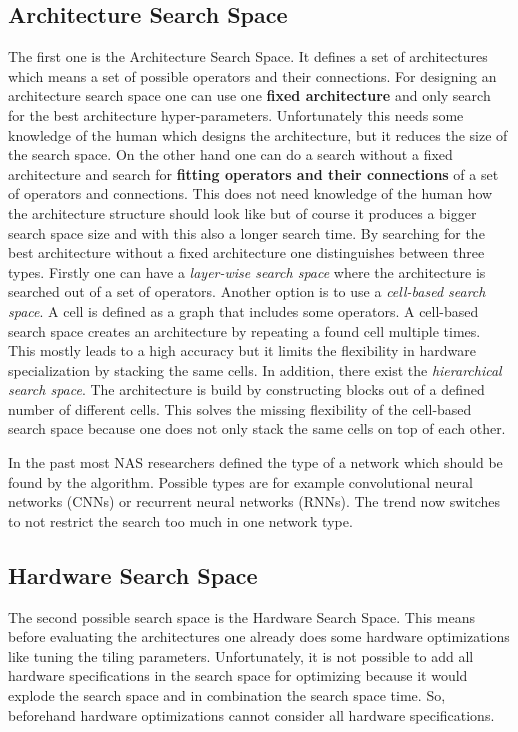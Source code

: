 \documentclass[conference]{IEEEtran}
\begin{document}
\subsection{Architecture Search Space}
The first one is the Architecture Search Space. It defines a set of architectures which means a set of possible operators and their connections. For designing an architecture search space one can use one \textbf{fixed architecture} and only search for the best architecture hyper-parameters. Unfortunately this needs some knowledge of the human which designs the architecture, but it reduces the size of the search space. On the other hand one can do a search without a fixed architecture and search for \textbf{fitting operators and their connections} of a set of operators and connections. This does not need knowledge of the human how the architecture structure should look like but of course it produces a bigger search space size and with this also a longer search time. By searching for the best architecture without a fixed architecture one distinguishes between three types. Firstly one can have a \textit{layer-wise search space} where the architecture is searched out of a set of operators. Another option is to use a \textit{cell-based search space}. A cell is defined as a graph that includes some operators. A cell-based search space creates an architecture by repeating a found cell multiple times. This mostly leads to a high accuracy but it limits the flexibility in hardware specialization by stacking the same cells. In addition, there exist the \textit{hierarchical search space}. The architecture is build by constructing blocks out of a defined number of different cells. This solves the missing flexibility of the cell-based search space because one does not only stack the same cells on top of each other. 

In the past most NAS researchers defined the type of a network which should be found by the algorithm. Possible types are for example convolutional neural networks (CNNs) or recurrent neural networks (RNNs). The trend now switches to not restrict the search too much in one network type. 

\subsection{Hardware Search Space}
The second possible search space is the Hardware Search Space. This means before evaluating the architectures one already does some hardware optimizations like tuning the tiling parameters. Unfortunately, it is not possible to add all hardware specifications in the search space for optimizing because it would explode the search space and in combination the search space time. So, beforehand hardware optimizations cannot consider all hardware specifications.
\end{document}

